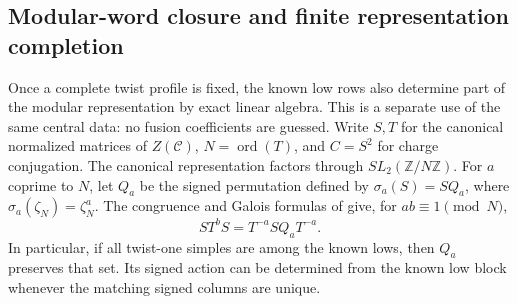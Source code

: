 \subsection{Modular-word closure and finite representation completion}
\label{subsec:modular-word-closure}

Once a complete twist profile is fixed, the known low rows also determine
part of the modular representation by exact linear algebra. This is a
separate use of the same central data: no fusion coefficients are guessed.
Write $S,T$ for the canonical normalized matrices of $Z(\mathcal C)$,
$N=\operatorname{ord}(T)$, and $C=S^2$ for charge conjugation.
The canonical representation factors through $SL_2(\mathbb Z/N\mathbb Z)$.
For $a$ coprime to $N$, let $Q_a$ be the signed permutation defined by
$\sigma_a(S)=SQ_a$, where $\sigma_a(\zeta_N)=\zeta_N^a$.
The congruence and Galois formulas of \cite[Theorem~II]{DLN} give, for
$ab\equiv1\pmod N$,
\begin{equation}\label{eq:modular-word-galois}
 ST^bS=T^{-a}SQ_aT^{-a}.
\end{equation}
In particular, if all twist-one simples are among the known lows, then
$Q_a$ preserves that set. Its signed action can be determined from the
known low block whenever the matching signed columns are unique.

